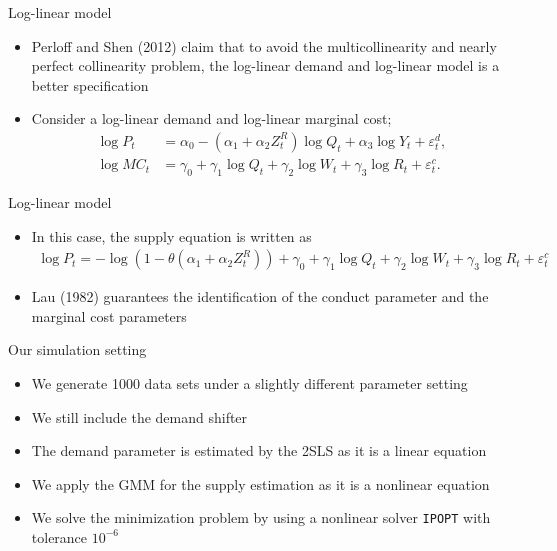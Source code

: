 \documentclass[aspectratio = 169]{beamer}
\theoremstyle{definition}
\begin{document}
\begin{frame}{Log-linear model}
    \begin{itemize}
        \item Perloff and Shen (2012) claim that to avoid the multicollinearity and nearly perfect collinearity problem, the log-linear demand and log-linear model is a better specification
        \item Consider a log-linear demand and log-linear marginal cost;
        \begin{align}
            \log P_{t} &= \alpha_0 - (\alpha_1 + \alpha_2 Z^{R}_{t}) \log Q_t + \alpha_3 \log Y_t + \varepsilon^{d}_{t},\label{eq:log_linear_demand}\\
            \log MC_t &= \gamma_0 + \gamma_1 \log Q_t +  \gamma_2 \log W_{t} + \gamma_3 \log R_t + \varepsilon^{c}_{t}.\label{eq:log_linear_marginal_cost}
        \end{align}
    \end{itemize}
\end{frame}


\begin{frame}{Log-linear model}
    \begin{itemize}
        \item In this case, the supply equation is written as
        \begin{align}
            \log P_t = - \log(1 - \theta(\alpha_1 + \alpha_2 Z^{R}_{t})) + \gamma_0 + \gamma_1 \log Q_t +  \gamma_2 \log W_{t} + \gamma_3 \log R_t + \varepsilon^{c}_{t}
        \end{align}
        \item Lau (1982) guarantees the identification of the conduct parameter and the marginal cost parameters
    \end{itemize}
\end{frame}

\begin{frame}{Our simulation setting}
    \begin{itemize}
        \item We generate 1000 data sets under a slightly different parameter setting
        \item We still include the demand shifter
        \item The demand parameter is estimated by the 2SLS as it is a linear equation
        \item We apply the GMM for the supply estimation as it is a nonlinear equation
        \item We solve the minimization problem by using a nonlinear solver \texttt{IPOPT} with tolerance $10^{-6}$
    \end{itemize}
\end{frame}
\end{document}
